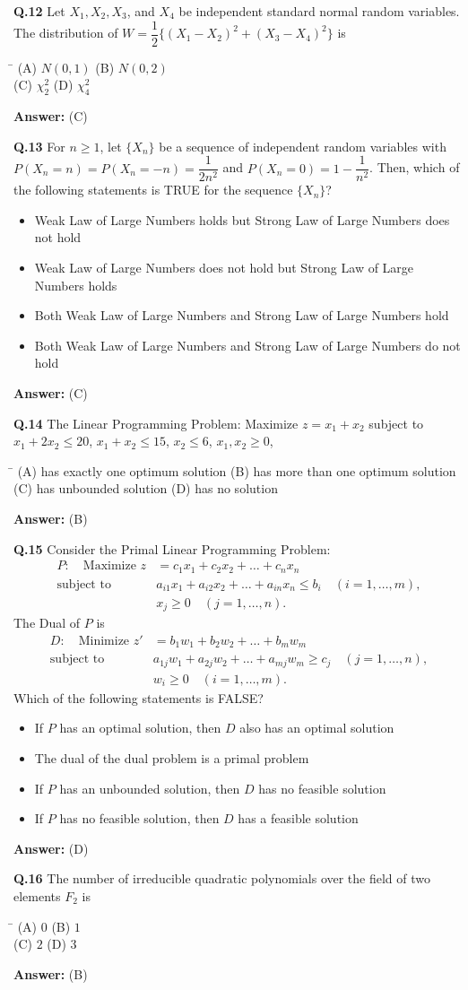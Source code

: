 \documentclass[11pt,a4paper]{article}
\newcommand{\optsfourA}[4]{%
  \begin{tabbing}
    \hspace{0.48\linewidth}\=\kill
    (A) #1 \> (B) #2 \\[2pt]
    (C) #3 \> (D) #4
  \end{tabbing}%
}
\newcommand{\optslistA}[4]{%
  \begin{itemize}
    \setlength{\itemsep}{2pt}\setlength{\parskip}{0pt}
    \item[(A)] #1
    \item[(B)] #2
    \item[(C)] #3
    \item[(D)] #4
  \end{itemize}%
}
\newcommand{\ans}[1]{\textbf{Answer:} #1\par\medskip}
\begin{document}
\textbf{Q.12} Let $X_1, X_2, X_3$, and $X_4$ be independent standard normal random variables. The distribution of $W = \dfrac{1}{2}\{(X_1 - X_2)^2 + (X_3 - X_4)^2\}$ is
\optsfourA{$N(0, 1)$}{$N(0, 2)$}{$\chi_2^2$}{$\chi_4^2$}
\ans{(C)}

\textbf{Q.13} For $n \ge 1$, let $\{X_n\}$ be a sequence of independent random variables with $P(X_n = n) = P(X_n = -n) = \dfrac{1}{2n^2}$ and $P(X_n = 0) = 1 - \dfrac{1}{n^2}$. Then, which of the following statements is TRUE for the sequence $\{X_n\}$?
\optslistA{Weak Law of Large Numbers holds but Strong Law of Large Numbers does not hold}{Weak Law of Large Numbers does not hold but Strong Law of Large Numbers holds}{Both Weak Law of Large Numbers and Strong Law of Large Numbers hold}{Both Weak Law of Large Numbers and Strong Law of Large Numbers do not hold}
\ans{(C)}

\textbf{Q.14} The Linear Programming Problem: Maximize $z = x_1 + x_2$ subject to $x_1 + 2x_2 \le 20$, $x_1 + x_2 \le 15$, $x_2 \le 6$, $x_1, x_2 \ge 0$,
\optsfourA{has exactly one optimum solution}{has more than one optimum solution}{has unbounded solution}{has no solution}
\ans{(B)}

\textbf{Q.15} Consider the Primal Linear Programming Problem:
\begin{align*}
  P : \quad \text{Maximize } z &= c_1 x_1 + c_2 x_2 + \dots + c_n x_n \\
  \text{subject to } & a_{i1} x_1 + a_{i2} x_2 + \dots + a_{in} x_n \le b_i \quad (i = 1, \dots, m), \\
  & x_j \ge 0 \quad (j = 1, \dots, n).
\end{align*}
The Dual of $P$ is
\begin{align*}
  D : \quad \text{Minimize } z' &= b_1 w_1 + b_2 w_2 + \dots + b_m w_m \\
  \text{subject to } & a_{1j} w_1 + a_{2j} w_2 + \dots + a_{mj} w_m \ge c_j \quad (j = 1, \dots, n), \\
  & w_i \ge 0 \quad (i = 1, \dots, m).
\end{align*}
Which of the following statements is FALSE?
\optslistA{If $P$ has an optimal solution, then $D$ also has an optimal solution}{The dual of the dual problem is a primal problem}{If $P$ has an unbounded solution, then $D$ has no feasible solution}{If $P$ has no feasible solution, then $D$ has a feasible solution}
\ans{(D)}

\textbf{Q.16} The number of irreducible quadratic polynomials over the field of two elements $F_2$ is
\optsfourA{$0$}{$1$}{$2$}{$3$}
\ans{(B)}
\end{document}
